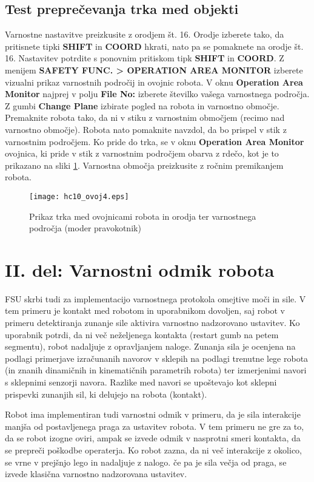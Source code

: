 \subsection*{Test preprečevanja trka med objekti}

Varnostne nastavitve preizkusite z orodjem št. 16. Orodje izberete tako, da pritisnete tipki \textbf{SHIFT} in \textbf{COORD} hkrati, nato pa se pomaknete na orodje št. 16. Nastavitev potrdite s ponovnim pritiskom tipk \textbf{SHIFT} in \textbf{COORD}. Z menijem \textbf{SAFETY FUNC. > OPERATION AREA MONITOR} izberete vizualni prikaz varnostnih področij in ovojnic robota. V oknu \textbf{Operation Area Monitor} najprej v polju \textbf{File No:} izberete številko vašega varnostnega področja. Z gumbi \textbf{Change Plane} izbirate pogled na robota in  varnostno območje. Premaknite robota tako, da ni v stiku z varnostnim območjem (recimo nad varnostno območje). Robota nato pomaknite navzdol, da bo prispel v stik z varnostnim področjem. Ko pride do trka, se v oknu \textbf{Operation Area Monitor} ovojnica, ki pride v stik z varnostnim področjem obarva z rdečo, kot je to prikazano na sliki \ref{fig:hc10_ovoj4}. Varnostna območja preizkusite z ročnim premikanjem robota.

\begin{figure}[!hbt]
	\centering
	\texttt{[image: hc10\_ovoj4.eps]}
	\caption{Prikaz trka med ovojnicami robota in orodja ter varnostnega področja (moder pravokotnik)}
	\label{fig:hc10_ovoj4}
\end{figure}

\section{II. del: Varnostni odmik robota} \label{poglavje2del_vaje}

FSU skrbi tudi za implementacijo varnostnega protokola omejtive moči in sile. V tem primeru je kontakt med robotom in uporabnikom dovoljen, saj robot v primeru detektiranja zunanje sile aktivira varnostno nadzorovano ustavitev. Ko uporabnik potrdi, da ni več neželjenega kontakta (restart gumb na petem segmentu), robot nadaljuje z opravljanjem naloge. Zunanja sila je ocenjena na podlagi primerjave izračunanih navorov v sklepih na podlagi trenutne lege robota (in znanih dinamičnih in kinematičnih parametrih robota) ter izmerjenimi navori s sklepnimi senzorji  navora. Razlike med navori se upoštevajo kot sklepni prispevki zunanjih sil, ki delujejo na robota (kontakt).

Robot ima implementiran tudi varnostni odmik v primeru, da je sila interakcije manjša od postavljenega praga za ustavitev robota. V tem primeru ne gre za to, da se robot izogne oviri, ampak se izvede odmik v nasprotni smeri kontakta, da se prepreči poškodbe operaterja. Ko robot zazna, da ni več interakcije z okolico, se vrne v prejšnjo lego in nadaljuje z nalogo. če pa je sila večja od praga, se izvede klasična varnostno nadzorovana ustavitev.

